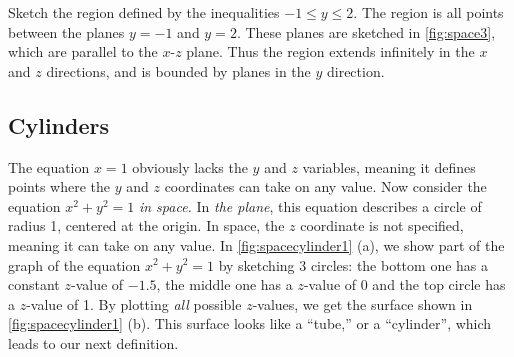 \begin{example}\label{ex_space3}%
Sketch the region defined by the inequalities $-1\leq y\leq 2$.
\solution
%
%
The region is all points between the planes $y=-1$ and $y=2$. These planes are sketched in \autoref{fig:space3}, which are parallel to the $x$-$z$ plane. Thus the region extends infinitely in the $x$ and $z$ directions, and is bounded by planes in the $y$ direction.
\end{example}

\subsection{Cylinders}

The equation $x=1$ obviously lacks the $y$ and $z$ variables, meaning it defines points where the $y$ and $z$ coordinates can take on any value. Now consider the equation $x^2+y^2=1$ \emph{in space.} In \emph{the plane}, this equation describes a circle of radius 1, centered at the origin. In space, the $z$ coordinate is not specified, meaning it can take on any value. In \autoref{fig:spacecylinder1} (a), we show part of the graph of the equation $x^2+y^2=1$ by sketching 3 circles: the bottom one has a constant $z$-value of $-1.5$, the middle one has a $z$-value of 0 and the top circle has a $z$-value of 1. By plotting \emph{all} possible $z$-values, we get the  surface shown in \autoref{fig:spacecylinder1} (b). This surface looks like a ``tube,'' or a ``cylinder'', which leads to our next definition.

\clearpage %


